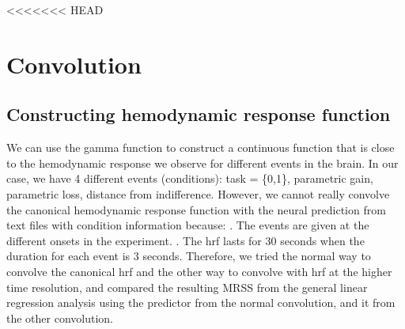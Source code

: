 <<<<<<< HEAD
\section {Convolution}

\subsection{Constructing hemodynamic response function}

We can use the gamma function to construct a continuous function that is close to 
the hemodynamic response we observe for different events in the brain. In our case,
we have 4 different events (conditions): task = \{0,1\}, parametric gain, parametric loss, distance 
from indifference. However, we cannot really convolve the canonical hemodynamic response function with the neural prediction from text files with condition information because:\newline
\newline
{}. The events are given at the different onsets in the experiment.\newline
{}. The hrf lasts for 30 seconds when the duration for each event is 3 seconds.\newline
\newline
Therefore, we tried the normal way to convolve the canonical hrf and the other way to convolve with hrf at the higher time resolution, and compared the resulting MRSS from the general linear regression analysis using the predictor from the normal convolution, and it from the other convolution.\newline



